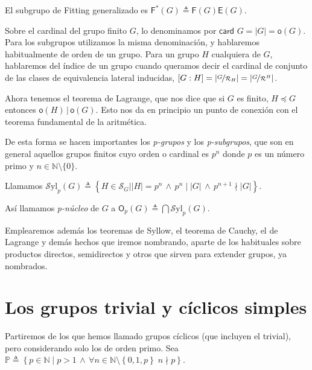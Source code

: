 \documentclass[12pt,a4paper,fleqn,spanish,final,openright]{extbook}
\theoremstyle{definition}
\theoremstyle{remark}
\begin{document}
El subgrupo de Fitting generalizado es 
$\mathsf{F}^{*}(G) \triangleq \mathsf{F}(G) \mathsf{E}(G)$.

Sobre el cardinal del grupo finito $G$, lo denominamos por 
$\textsf{card }G = \left| G \right| = \mathsf{o}(G)$. 
Para los subgrupos utilizamos la misma denominación, y hablaremos 
habitualmente de orden de un grupo. Para un grupo $H$ cualquiera 
de $G$, hablaremos del índice de un grupo cuando queramos decir 
el cardinal de conjunto de las clases de equivalencia lateral inducidas, 
$\left[ G : H \right] = \left| \nicefrac{G}{\mathcal{R}_H} \right| =
\left| \nicefrac{G}{\mathcal{R}^H} \right| $.

Ahora tenemos el teorema de Lagrange, que nos dice que si $G$ es finito, 
$H   \preccurlyeq    G$ entonces ${\mathsf{o}(H)} \,\vert\, {{\mathsf{o}}(G)}$. 
Esto nos da en principio un punto de conexión con el teorema fundamental de la aritmética.

De esta forma se hacen importantes los \emph{p-grupos} y los 
\emph{p-subgrupos}, que son en general aquellos grupos finitos cuyo 
orden o cardinal es $p^n$ donde $p$ es un número primo y 
$n \in \mathds{N}\setminus\lbrace 0\rbrace$.

Llamamos ${\mathcal{S}\text{yl}}_{p}(G) \triangleq \left\lbrace H \in \mathcal{S}_{G} 
\vert \left| H \right|=p^n \, \wedge \, p^{n}∣\left| G \right| \, \wedge \, p^{n+1}
\nmid \left| G \right| \right\rbrace$.

Así llamamos \emph{p-núcleo} de $G$ a 
$\mathsf{O}_{p}(G) \triangleq \bigcap {\mathcal{S}\text{yl}}_{p}(G)$.

Emplearemos además los teoremas de Syllow, el teorema de Cauchy, el de Lagrange y 
demás hechos que iremos nombrando, aparte de los habituales sobre productos directos, 
semidirectos y otros que sirven para extender grupos, ya nombrados.

\chapter{Los grupos trivial y cíclicos simples}

Partiremos de los que hemos llamado grupos cíclicos (que incluyen el trivial), 
pero considerando solo los de orden primo. Sea 
$\mathds{P} \triangleq {\left\lbrace{{p    \in \mathds{N}}∣{p>1\,   
\wedge   
\,\forall n   
\in \mathds{N}\setminus{\left\lbrace{0,1,p}\right\rbrace}\; n\nmid p}}\right\rbrace}$.
\end{document}
